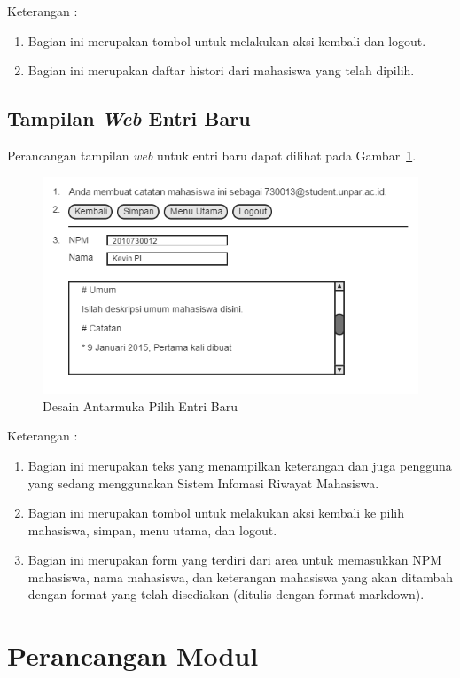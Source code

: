Keterangan :
\begin{enumerate}[(1)]
\item
Bagian ini merupakan tombol untuk melakukan aksi kembali dan logout.	
\item
Bagian ini merupakan daftar histori dari mahasiswa yang telah dipilih.
\end{enumerate}

\subsection{Tampilan {\it Web} Entri Baru}
Perancangan tampilan {\it web} untuk entri baru dapat dilihat pada Gambar~\ref{fig:entribaru}.
\begin{figure}[ht]
\centering
\includegraphics[scale=0.9]{Gambar/entribaru.png}
\caption[Desain Antarmuka Entri Baru]{Desain Antarmuka Pilih Entri Baru}
\label{fig:entribaru}
\end{figure}

Keterangan :
\begin{enumerate}[(1)]
\item
Bagian ini merupakan teks yang menampilkan keterangan dan juga pengguna yang
sedang menggunakan Sistem Infomasi Riwayat Mahasiswa.
\item
Bagian ini merupakan tombol untuk melakukan aksi kembali ke pilih mahasiswa,
simpan, menu utama, dan logout.
\item
Bagian ini merupakan form yang terdiri dari area untuk memasukkan NPM mahasiswa,
nama mahasiswa, dan keterangan mahasiswa yang akan ditambah dengan format yang
telah disediakan (ditulis dengan format markdown).
\end{enumerate}

\section{Perancangan Modul}
\label{sec:perancanganmodul}

